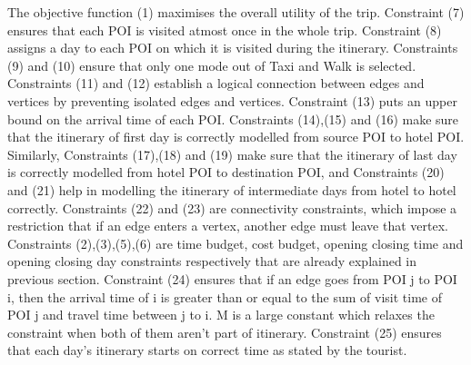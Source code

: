 The objective function (1) maximises the overall utility of the trip. Constraint (7) ensures that each POI is visited atmost once in the whole trip. Constraint (8) assigns a day to each POI on which it is visited during the itinerary. Constraints (9) and (10) ensure that only one mode out of Taxi and Walk is selected. Constraints (11) and (12) establish a logical connection between edges and vertices by preventing isolated edges and vertices. Constraint (13) puts an upper bound on the arrival time of each POI. Constraints (14),(15) and (16) make sure that the itinerary of first day is correctly modelled from source POI to hotel POI. Similarly, Constraints (17),(18) and (19) make sure that the itinerary of last day is correctly modelled from hotel POI to destination POI, and Constraints (20) and (21) help in modelling the itinerary of intermediate days from hotel to hotel correctly. Constraints (22) and (23) are connectivity constraints, which impose a restriction that if an edge enters a vertex, another edge must leave that vertex. Constraints (2),(3),(5),(6) are time budget, cost budget, opening closing time and opening closing day constraints respectively that are already explained in previous section. Constraint (24) ensures that if an edge goes from POI j to POI i, then the arrival time of i is greater than or equal to the sum of visit time of POI j and travel time between j to i. M is a large constant which relaxes the constraint when both of them aren't part of itinerary. Constraint (25) ensures that each day's itinerary starts on correct time as stated by the tourist.


